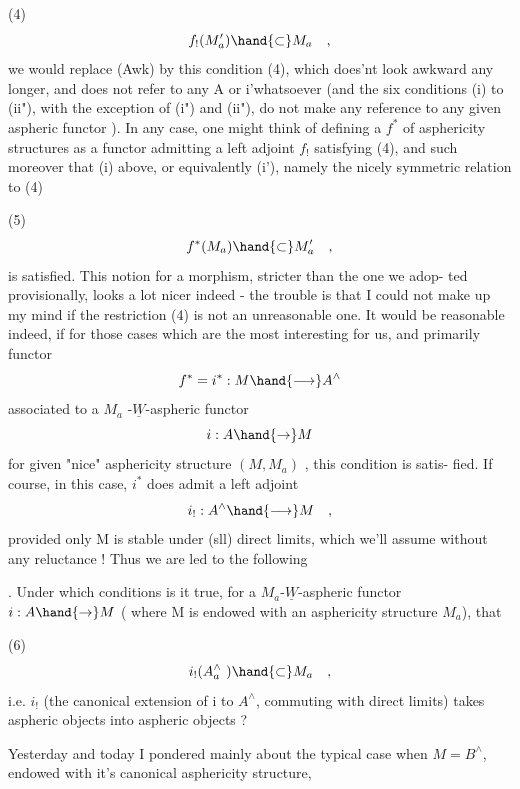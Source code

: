 
(4) \[ f_{!}(M'_a) \hand{\subset} M_a \quad , \]
we would replace (Awk) by this condition (4), which does'nt look awkward
any longer, and does not refer to any A or i'whatsoever (and 
the  six conditions (i) to (ii"), with the exception of (i")
and (ii"), do not make any reference to any given aspheric functor ).
In any case, one might think of defining a \hand{\uline{\textcolor{black}{morphism}}} $f^*$ of asphericity
structures as a functor admitting a left adjoint $f_{!}$ satisfying (4), and
such moreover that (i) above, or equivalently (i'), namely the nicely
symmetric relation to (4)

(5) \[ f^*(M_a) \hand{\subset} M'_a \quad , \]
is satisfied. This notion for a morphism, stricter than the one we adop-%
ted provisionally, looks a lot nicer indeed - the trouble is that I
could not make up my mind if the restriction (4) is not  an unreasonable
one. It would be reasonable indeed, if for those cases which are the most
interesting for us, and primarily  functor
\[ f^* = i^* : M \hand{\longrightarrow} A^{\wedge} \]
associated to a $M_a$%
-$\underline{W}$-aspheric functor
\[ i: A \hand{\to} M \]
for   given "nice" asphericity structure $(M,M_a)$ , this condition is satis-%
fied. If course, in this case, $i^*$ does admit a left adjoint
\[ i_{!} : A^{\wedge} \hand{\longrightarrow} M \quad , \]
provided only M is stable under (sll) direct limits, which we'll assume
without any reluctance ! Thus we are led to the following

\hand{\uline{\textcolor{black}{Question}}}. Under which conditions is it true, for a $M_a$-$\underline{W}$-aspheric
functor $i: A \hand{\to} M$ ( where M is endowed with an asphericity structure $M_a$),
that

(6) \[ i_{!}(A^{\wedge}_a \ ) \hand{\subset} M_a \quad , \]
i.e. $i_{!}$ (the canonical extension of i to $A^{\wedge}$, commuting with direct
limits) takes aspheric objects into aspheric objects ?

 Yesterday and today I pondered mainly about the typical
case when $M = B^{\wedge}$, endowed with it's canonical asphericity structure,

